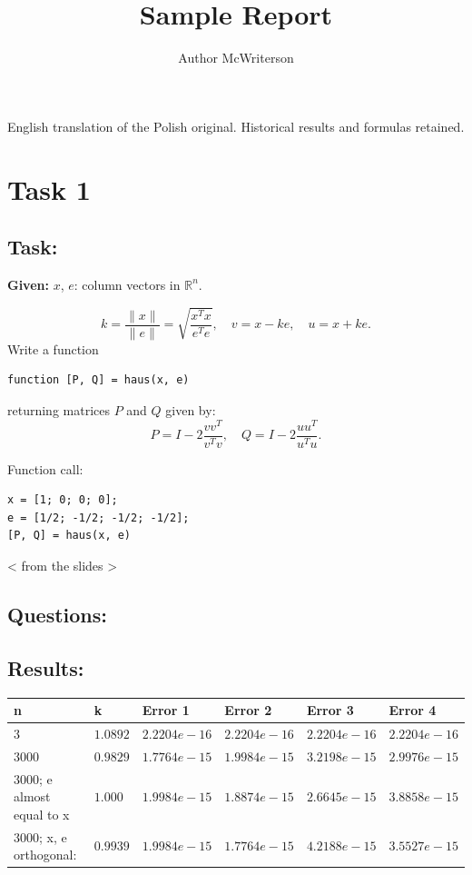 \documentclass[a4paper, 11pt]{article}
\title{Sample Report}
\author{Author McWriterson}
\begin{document}
\maketitle
\begin{center}\small English translation of the Polish original. Historical results and formulas retained.\end{center}
\tableofcontents

\section{Task 1}
\subsection{Task:}
\noindent \textbf{Given:} \( x \), \( e \): column vectors in \( \mathbb{R}^n \).

\[
k = \frac{\|x\|}{\|e\|} = \sqrt{\frac{x^T x}{e^T e}}, \quad v = x - k e, \quad u = x + k e.
\]
Write a function
\begin{center}
\begin{verbatim}
function [P, Q] = haus(x, e)
\end{verbatim}
\end{center}
returning matrices \( P \) and \( Q \) given by:
\[
P = I - 2 \frac{v v^T}{v^T v}, \quad Q = I - 2 \frac{u u^T}{u^T u}.
\]

Function call:
\begin{center}
\begin{verbatim}
x = [1; 0; 0; 0];
e = [1/2; -1/2; -1/2; -1/2];
[P, Q] = haus(x, e)
\end{verbatim}
\end{center}
< from the slides >
\subsection{Questions:} 

\subsection{Results:} 
\begin{center}
\begin{tabular}{@{}|l|l|l|l|l|l|@{}}
\toprule
n                         & k      & Error 1      & Error 2      & Error 3      & Error 4      \\ \hline
3                         &$ 1.0892$ & $2.2204 e-16$ & $2.2204 e-16$ & $2.2204 e-16$ & $2.2204 e-16$ \\ \hline
3000                      & $0.9829$ & $1.7764 e-15$ & $1.9984 e-15$ & $3.2198 e-15$ & $2.9976 e-15$ \\ \hline
3000; e almost equal to x &$ 1.000$ & $1.9984 e-15$ & $1.8874 e-15$ &$ 2.6645 e-15$ & $3.8858 e-15$ \\ \hline
3000; x, e orthogonal: & $0.9939$ & $1.9984 e-15$ & $1.7764 e-15$ & $4.2188 e-15$ & $3.5527 e-15$ \\ \hline
\end{tabular}
\end{center}
\end{document}
